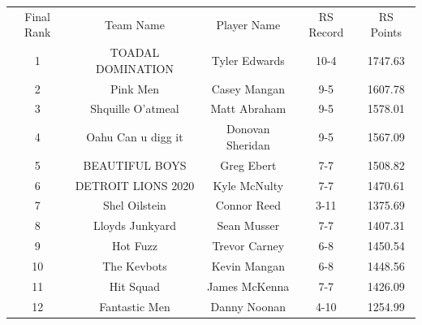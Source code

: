 \documentclass[11pt,letterpaper]{article}
\begin{document}
\newpage
{}
\vspace{-25pt}
\begin{table} [h]
\begin{center}
\begin{tabular} { c c c c c }
\\ Final Rank & Team Name & Player Name & RS Record & RS Points
\\ 1 & TOADAL DOMINATION & Tyler Edwards & 10-4 & 1747.63
\\ 2 & Pink Men & Casey Mangan & 9-5 & 1607.78
\\ 3 & Shquille O'atmeal & Matt Abraham & 9-5 & 1578.01
\\ 4 & Oahu Can u digg it & Donovan Sheridan & 9-5 & 1567.09
\\ 5 & BEAUTIFUL BOYS & Greg Ebert & 7-7 & 1508.82
\\ 6 & DETROIT LIONS 2020 & Kyle McNulty & 7-7 & 1470.61
\\ 7 & Shel Oilstein & Connor Reed & 3-11 & 1375.69
\\ 8 & Lloyds Junkyard & Sean Musser & 7-7 & 1407.31
\\ 9 & Hot Fuzz & Trevor Carney & 6-8 & 1450.54
\\ 10 & The Kevbots & Kevin Mangan & 6-8 & 1448.56
\\ 11 & Hit Squad & James McKenna & 7-7 & 1426.09
\\ 12 & Fantastic Men & Danny Noonan & 4-10 & 1254.99
\end{tabular}
\end{center}
\end{table}
\end{document}
